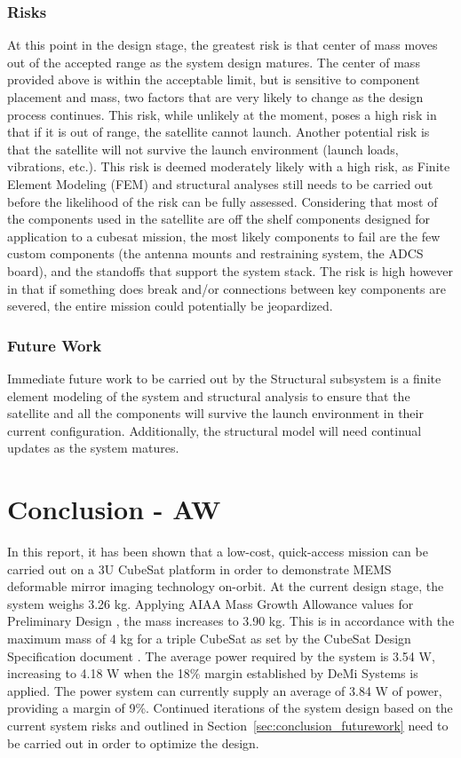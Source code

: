 \documentclass[12pt]{article}
\begin{document}
\subsubsection{Risks}
At this point in the design stage, the greatest risk is that center of mass moves out of the accepted range as the system design matures. The center of mass provided above is within the acceptable limit, but is sensitive to component placement and mass, two factors that are very likely to change as the design process continues. This risk, while unlikely at the moment, poses a high risk in that if it is out of range, the satellite cannot launch.
Another potential risk is that the satellite will not survive the launch environment (launch loads, vibrations, etc.). This risk is deemed moderately likely with a high risk, as Finite Element Modeling (FEM) and structural analyses still needs to be carried out before the likelihood of the risk can be fully assessed. Considering that most of the components used in the satellite are off the shelf components designed for application to a cubesat mission, the most likely components to fail are the few custom components (the antenna mounts and restraining system, the ADCS board), and the standoffs that support the system stack. The risk is high however in that if something does break and/or connections between key components are severed, the entire mission could potentially be jeopardized.

\subsubsection{Future Work}
Immediate future work to be carried out by the Structural subsystem is a finite element modeling of the system and structural analysis to ensure that the satellite and all the components will survive the launch environment in their current configuration. Additionally, the structural model will need continual updates as the system matures.


\section{Conclusion - AW}

In this report, it has been shown that a low-cost, quick-access mission can be carried out on a 3U CubeSat platform in order to demonstrate MEMS deformable mirror imaging technology on-orbit.  At the current design stage, the system weighs 3.26 kg.  Applying AIAA Mass Growth Allowance values for Preliminary Design \cite{mission_aiaa}, the mass increases to 3.90 kg.  This is in accordance with the maximum mass of 4 kg for a triple CubeSat as set by the CubeSat Design Specification document \cite{cubesat-specs}.  The average power required by the system is 3.54 W, increasing to 4.18 W when the 18\% margin established by DeMi Systems is applied.  The power system can currently supply an average of 3.84 W of power, providing a margin of 9\%.   Continued iterations of the system design based on the current system risks and outlined in Section~\ref{sec:conclusion_futurework} need to be carried out in order to optimize the design. 
\end{document}

